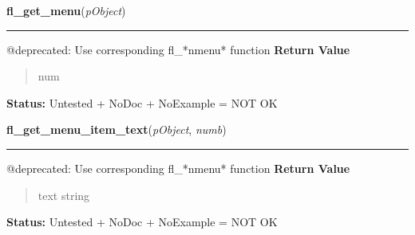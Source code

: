 \hspace{.8\funcindent}\begin{boxedminipage}{\funcwidth}

    \raggedright \textbf{fl\_get\_menu}(\textit{pObject})

    \vspace{-1.5ex}

    \rule{\textwidth}{0.5\fboxrule}
\setlength{\parskip}{2ex}

@deprecated: Use corresponding fl\_*nmenu* function
\setlength{\parskip}{1ex}
      \textbf{Return Value}
    \vspace{-1ex}

      \begin{quote}

num
      \end{quote}

\textbf{Status:} 
Untested + NoDoc + NoExample = NOT OK


    \end{boxedminipage}

    \label{xformslib:deprecated:fl_get_menu_item_text}

    \vspace{0.5ex}

\hspace{.8\funcindent}\begin{boxedminipage}{\funcwidth}

    \raggedright \textbf{fl\_get\_menu\_item\_text}(\textit{pObject}, \textit{numb})

    \vspace{-1.5ex}

    \rule{\textwidth}{0.5\fboxrule}
\setlength{\parskip}{2ex}

@deprecated: Use corresponding fl\_*nmenu* function
\setlength{\parskip}{1ex}
      \textbf{Return Value}
    \vspace{-1ex}

      \begin{quote}

text string
      \end{quote}

\textbf{Status:} 
Untested + NoDoc + NoExample = NOT OK


    \end{boxedminipage}

    \label{xformslib:deprecated:fl_get_menu_maxitems}

